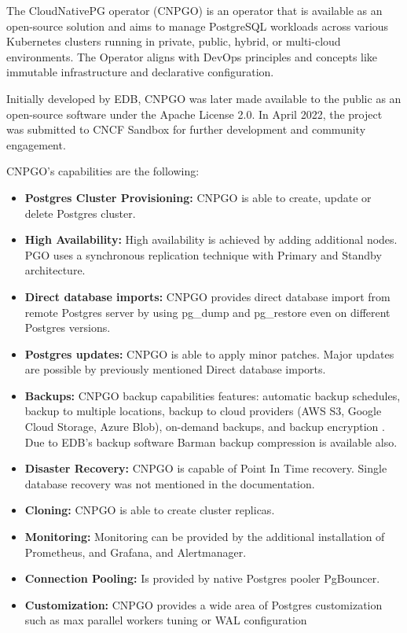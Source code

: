 \pagebreak

The CloudNativePG operator (CNPGO) is an operator that is available as an open-source solution and aims to manage PostgreSQL workloads across various Kubernetes clusters running in private, public, hybrid, or multi-cloud environments. The Operator aligns with DevOps principles and concepts like immutable infrastructure and declarative configuration. \cite{CNPGdocu}

Initially developed by EDB, CNPGO was later made available to the public as an open-source software under the Apache License 2.0. In April 2022, the project was submitted to CNCF Sandbox for further development and community engagement. \cite{CNPGdocu}

CNPGO’s capabilities are the following:
\begin{itemize}
  \item \textbf{Postgres Cluster Provisioning:} CNPGO is able to create, update or delete Postgres cluster. \cite{CNPGdocuCapabilityLevels}
  \item \textbf{High Availability:} High availability is achieved by adding additional nodes. PGO uses a synchronous replication technique with Primary and Standby architecture. \cite{CNPGdocuReplication}
  \item \textbf{Direct database imports:} CNPGO provides direct database import from remote Postgres server by using pg\_dump and pg\_restore even on different Postgres versions. \cite{CNPGdocuDatabaseImports}
  \item \textbf{Postgres updates:} CNPGO is able to apply minor patches. \cite{CNPGdocuUpdates} Major updates are possible by previously mentioned Direct database imports.
  \item \textbf{Backups:} CNPGO backup capabilities features: automatic backup schedules, backup to multiple locations, backup to cloud providers (AWS S3, Google Cloud Storage, Azure Blob), on-demand backups, and backup encryption \cite{CNPGdocuBackup}\cite{CNPGdocuTDE}. Due to EDB’s backup software Barman backup compression is available also. \cite{CNPGdocuBackup}
  \item \textbf{Disaster Recovery:} CNPGO is capable of Point In Time recovery. Single database recovery was not mentioned in the documentation. \cite{CNPGdocuBackup}
  \item \textbf{Cloning:} CNPGO is able to create cluster replicas. \cite{CNPGdocuReplication}
  \item \textbf{Monitoring:} Monitoring can be provided by the additional installation of Prometheus, and Grafana, and Alertmanager. \cite{CNPGdocuQuickstart}
  \item \textbf{Connection Pooling:} Is provided by native Postgres pooler PgBouncer. \cite{CNPGdocuConnectionPooling}
  \item \textbf{Customization:} CNPGO provides a wide area of Postgres customization such as max parallel workers tuning or WAL configuration \cite{CNPGdocuConfiguration}
\end{itemize}

